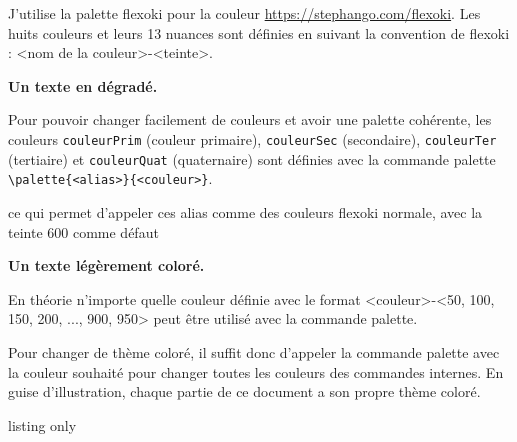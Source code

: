 

J'utilise la palette flexoki pour la couleur \url{https://stephango.com/flexoki}. 
Les huits couleurs et leurs 13 nuances sont définies en suivant la convention de flexoki : <nom de la couleur>-<teinte>.
\begin{boiteCodeTex}{}
  \bfseries \textcolor{blue-200}{Un}
  \textcolor{blue-400}{texte}
  \textcolor{blue-600}{en}
  \textcolor{blue-800}{dégradé}.
\end{boiteCodeTex}



Pour pouvoir changer facilement de couleurs et avoir une palette cohérente, les couleurs \lstinline|couleurPrim| (couleur primaire), \lstinline|couleurSec| (secondaire), \lstinline|couleurTer| (tertiaire) et \lstinline|couleurQuat| (quaternaire) sont définies avec la commande palette \lstinline|\palette{<alias>}{<couleur>}|.

ce qui permet d'appeler ces alias comme des couleurs flexoki normale, avec la teinte 600 comme défaut
\begin{boiteCodeTex}{}
  \bfseries
  \textcolor{couleurPrim}{Un}
  \textcolor{couleurSec-700}{texte}
  \textcolor{couleurTer}{légèrement}
  \textcolor{couleurQuat}{coloré}.
\end{boiteCodeTex}
En théorie n'importe quelle couleur définie avec le format <couleur>-<50, 100, 150, 200, ..., 900, 950> peut être utilisé avec la commande palette.

Pour changer de thème coloré, il suffit donc d'appeler la commande palette avec la couleur souhaité pour changer toutes les couleurs des commandes internes.
En guise d'illustration, chaque partie de ce document a son propre thème coloré.

\begin{boiteCodeTex}{listing only}
\end{boiteCodeTex}
